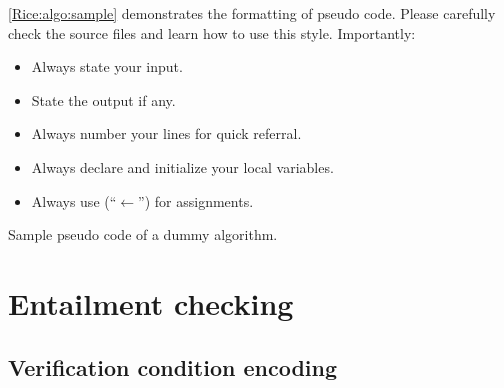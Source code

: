 \autoref{Rice:algo:sample} demonstrates the formatting of pseudo code. 
Please carefully check the source files and learn how to use this style. 
Importantly:

\begin{itemize}
\item Always state your input.

\item State the output if any. 

\item Always number your lines for quick referral.

\item Always declare and initialize your local variables. 

\item Always use \CMD{\gets} (``$\gets$'') for assignments.
\end{itemize}

\begin{algorithm}[!t]
\AlgoFontSize
\DontPrintSemicolon

\BlankLine



\BlankLine


\caption{Sample pseudo code of a dummy algorithm.}
\label{Rice:algo:sample}
\end{algorithm}



\section{Entailment checking}

\subsection{Verification condition encoding}


